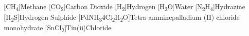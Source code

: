 \begin{acronym}
    [CH\textsubscript{4}]{Methane}
    [CO\textsubscript{2}]{Carbon Dioxide}
    [H\textsubscript{2}]{Hydrogen}
    [H\textsubscript{2}O]{Water}
    [N\textsubscript{2}H\textsubscript{4}]{Hydrazine}
    [H\textsubscript{2}S]{Hydrogen Sulphide}
    [PdNH\textsubscript{3}4Cl\textsubscript{2}H\textsubscript{2}O]{Tetra-amminepalladium (II) chloride monohydrate}
    [SnCl\textsubscript{2}]{Tin(ii)Chloride}

\end{acronym}